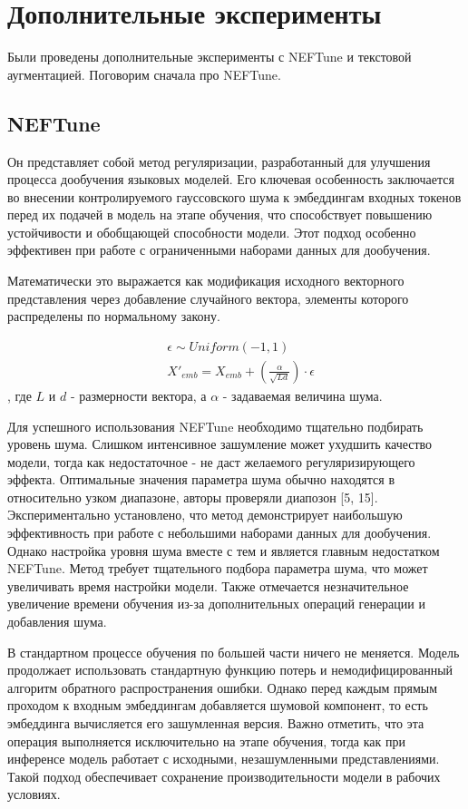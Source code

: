 \section{Дополнительные эксперименты}

Были проведены дополнительные эксперименты с NEFTune\cite{jain2023neftune} и текстовой аугментацией.
Поговорим сначала про NEFTune.

\subsection{NEFTune}
Он представляет собой метод регуляризации, разработанный для улучшения процесса дообучения языковых моделей.
Его ключевая особенность заключается во внесении контролируемого гауссовского шума к эмбеддингам входных токенов перед их подачей в модель на этапе обучения, что способствует повышению устойчивости и обобщающей способности модели.
Этот подход особенно эффективен при работе с ограниченными наборами данных для дообучения.

Математически это выражается как модификация исходного векторного представления через добавление случайного вектора, элементы которого распределены по нормальному закону.

\begin{equation}
  \begin{aligned}
    &\epsilon \sim Uniform(-1, 1) \\
    &X'_{emb} = X_{emb} + (\frac{\alpha}{\sqrt{Ld}})\cdot\epsilon  
  \end{aligned}
  \label{eq:neftune}
\end{equation}
, где $L$ и $d$ - размерности вектора, а $\alpha$ - задаваемая величина шума.

Для успешного использования NEFTune необходимо тщательно подбирать уровень шума.
Слишком интенсивное зашумление может ухудшить качество модели, тогда как недостаточное - не даст желаемого регуляризирующего эффекта.
Оптимальные значения параметра шума обычно находятся в относительно узком диапазоне, авторы проверяли диапозон [5, 15].
Экспериментально установлено, что метод демонстрирует наибольшую эффективность при работе с небольшими наборами данных для дообучения.
Однако настройка уровня шума вместе с тем и является главным недостатком NEFTune.
Метод требует тщательного подбора параметра шума, что может увеличивать время настройки модели.
Также отмечается незначительное увеличение времени обучения из-за дополнительных операций генерации и добавления шума.

В стандартном процессе обучения по большей части ничего не меняется.
Модель продолжает использовать стандартную функцию потерь и немодифицированный алгоритм обратного распространения ошибки.
Однако перед каждым прямым проходом к входным эмбеддингам добавляется шумовой компонент, то есть эмбеддинга вычисляется его зашумленная версия.
Важно отметить, что эта операция выполняется исключительно на этапе обучения, тогда как при инференсе модель работает с исходными, незашумленными представлениями.
Такой подход обеспечивает сохранение производительности модели в рабочих условиях.

